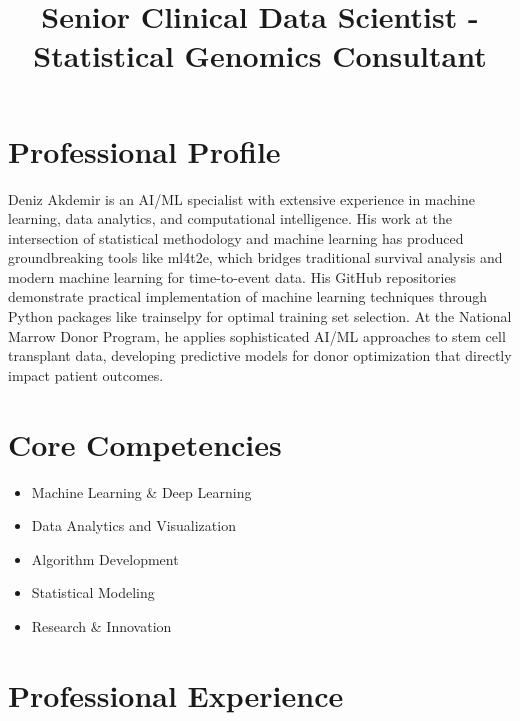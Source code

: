 \documentclass[11pt,a4paper,]{moderncv}
\title{Senior Clinical Data Scientist - Statistical Genomics Consultant}
\providecommand{\tightlist}{%
	\setlength{\itemsep}{0pt}\setlength{\parskip}{0pt}}
\begin{document}
\makecvtitle



\section{Professional Profile}\label{professional-profile}

Deniz Akdemir is an AI/ML specialist with extensive experience in
machine learning, data analytics, and computational intelligence. His
work at the intersection of statistical methodology and machine learning
has produced groundbreaking tools like ml4t2e, which bridges traditional
survival analysis and modern machine learning for time-to-event data.
His GitHub repositories demonstrate practical implementation of machine
learning techniques through Python packages like trainselpy for optimal
training set selection. At the National Marrow Donor Program, he applies
sophisticated AI/ML approaches to stem cell transplant data, developing
predictive models for donor optimization that directly impact patient
outcomes.

\section{Core Competencies}\label{core-competencies}

\begin{itemize}
\tightlist
\item
  Machine Learning \& Deep Learning
\item
  Data Analytics and Visualization
\item
  Algorithm Development
\item
  Statistical Modeling
\item
  Research \& Innovation
\end{itemize}

\section{Professional Experience}\label{professional-experience}
\end{document}
